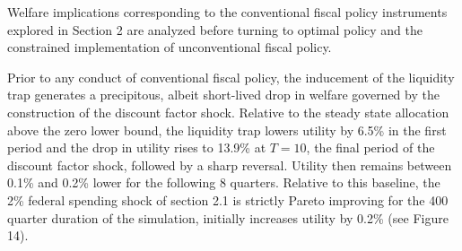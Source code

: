 \documentclass[12pt,letterpaper]{article}
\begin{document}

Welfare implications corresponding to the conventional fiscal policy instruments explored in Section 2 are analyzed before turning to optimal policy and the constrained implementation of unconventional fiscal policy. 

\bigskip

Prior to any conduct of conventional fiscal policy, the inducement of the liquidity trap generates a precipitous, albeit short-lived drop in welfare governed by the construction of the discount factor shock. Relative to the steady state allocation above the zero lower bound, the liquidity trap lowers utility by 6.5\% in the first period and the drop in utility rises to 13.9\% at $T=10$, the final period of the discount factor shock, followed by a sharp reversal. Utility then remains between 0.1\% and 0.2\% lower for the following 8 quarters. Relative to this baseline, the 2\% federal spending shock of section 2.1 is strictly Pareto improving for the 400 quarter duration of the simulation, initially increases utility by 0.2\% (see Figure 14). 
\end{document}
